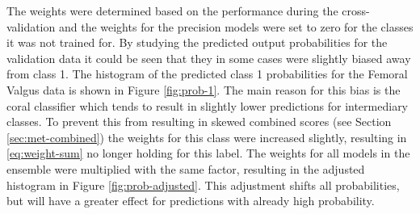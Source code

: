 The weights were determined based on the performance during the cross-validation and the weights for the precision models were set to zero for the classes it was not trained for. By studying the predicted output probabilities for the validation data it could be seen that they in some cases were slightly biased away from class 1. The histogram of the predicted class 1 probabilities for the Femoral Valgus data is shown in Figure \ref{fig:prob-1}. The main reason for this bias is the \gls{coral} classifier which tends to result in slightly lower predictions for intermediary classes. To prevent this from resulting in skewed combined scores (see Section \ref{sec:met-combined}) the weights for this class were increased slightly, resulting in \eqref{eq:weight-sum} no longer holding for this label. The weights for all models in the ensemble were multiplied with the same factor, resulting in the adjusted histogram in Figure \ref{fig:prob-adjusted}. This adjustment shifts all probabilities, but will have a greater effect for predictions with already high probability.

